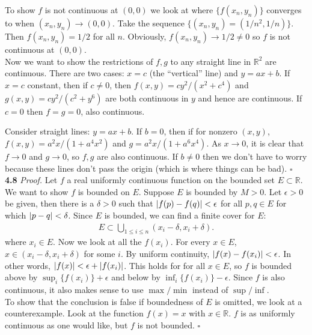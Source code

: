 \documentclass[11pt]{article}
\begin{document}
To show $f$ is not continuous at $(0,0)$ we look at where $\{ f(x_n,y_n)\}$ converges to when $(x_n,y_n) \to (0,0)$. Take the sequence $\{ (x_n,y_n) = (1/n^2,1/n) \}$. Then $f(x_n,y_n) = 1/2$ for all $n$. Obviously, $f(x_n,y_n) \to 1/2 \neq 0$ so $f$ is not continuous at $(0,0)$. \\

Now we want to show the restrictions of $f,g$ to any straight line in $\mathbb{R}^2$ are continuous. There are two cases: $x=c$ (the ``vertical'' line) and $y = ax+b$.  If $x=c$ constant, then if $c\neq 0$, then $f(x,y) = cy^2 / (x^2 + c^4)$ and $g(x,y) = cy^2 / (c^2 + y^6)$ are both continuous in $y$ and hence are continuous. If $c = 0$ then $f = g = 0$, also continuous. 

Consider straight lines: $y = ax + b$. If $b = 0$, then if for nonzero $(x,y)$, $f(x,y) = a^2x / (1 + a^4x^2)$ and $g = a^2x / (1 + a^6 x^4)$. As $x\to 0$, it is clear that $f \to 0$ and $g\to 0$, so $f,g$ are also continuous. If $b\neq 0$ then we don't have to worry because these lines don't pass the origin (which is where things can be bad). \hfill $\square$\\





\noindent \textbf{4.8}   
\noindent \textit{Proof.} Let $f$ a real uniformly continuous function on the bounded set $E \subset \mathbb{R}$. We want to show $f$ is bounded on $E$. Suppose $E$ is bounded by $M > 0$. Let $\epsilon > 0$ be given, then there is a $\delta > 0$ such that $\abs{f(p) - f(q)} < \epsilon$ for all $p,q\in E$ for which $\abs{p-q} < \delta$.  Since $E$ is bounded, we can find a finite cover for $E$:
\begin{align*}
E \subset \bigcup_{1\leq i \leq n} (x_i - \delta, x_i + \delta).
\end{align*}
where $x_i \in E$. Now we look at all the $f(x_i)$. For every $x \in E$, $x \in (x_i - \delta, x_i + \delta)$ for some $i$. By uniform continuity, $\abs{f(x) - f(x_i)} < \epsilon$. In other words, $\abs{f(x)} < \epsilon + \abs{f(x_i)}$. This holds for for all $x\in E$, so $f$ is bounded above by $\sup_i \{ f(x_i) \} + \epsilon$ and below by $\inf_i \{  f(x_i) \} - \epsilon$. Since $f$ is also continuous, it also makes sense to use $\max/\min$ instead of $\sup/\inf$.\\  
 

To show that the conclusion is false if boundedness of $E$ is omitted, we look at a counterexample. Look at the function $f(x) = x$ with $x\in \mathbb{R}$. $f$ is as uniformly continuous as one would like, but $f$ is not bounded. \hfill $\square$\\ 
\end{document}
